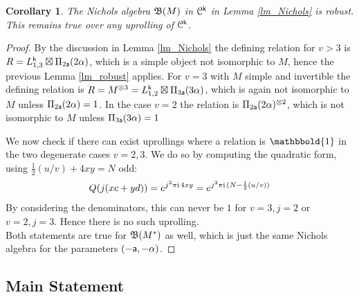 \documentclass[a4paper, reqno]{amsart}
\newtheorem{corollary}[theorem]{Corollary}
\theoremstyle{introTheorems}
\newcommand\cC{\mathcal{C}}
\renewcommand{\1}{\mathbbold{1}}
\begin{document}


\begin{corollary}\label{cor_robust}    
The Nichols algebra $\mathfrak{B}(M)$ in $\cC^\k$ in Lemma \ref{lm_Nichols} is robust. This remains true over any uprolling of $\cC^\k$. 
\end{corollary}
\begin{proof}
 By the discussion in Lemma \ref{lm_Nichols} the defining relation for $v>3$ is  $R=L^{\mathsf{k}}_{1,3}\boxtimes\Pi_{2\mathsf{a}}(2\alpha)$, which is a simple object not isomorphic to $M$, hence the previous Lemma \ref{lm_robust} applies. For $v=3$ with $M$ simple and invertible the defining relation is $R=M^{\otimes 3}=L^{\mathsf{k}}_{1,2}\boxtimes\Pi_{3\mathsf{a}}(3\alpha)$, which is again not isomorphic to $M$ unless $\Pi_{2\mathsf{a}}(2\alpha)=1$. In the case $v=2$ the relation is $\Pi_{2\mathsf{a}}(2\alpha)^{\otimes 2}$, which is not isomorphic to $M$ unless $\Pi_{3\mathsf{a}}(3\alpha)=1$ 

We now check if there can exist uprollings where a relation is $\1$ in the two degenerate cases $v=2,3$. We do so by computing the quadratic form, using $\frac12(u/v)+4xy=N$ odd: 
\[Q(j(xc+yd))
=e^{j^2\pi\mathrm{i} \,4xy }
=e^{j^2\pi\mathrm{i}\,(N-\frac12(u/v))}\]
By considering the denominators, this can never be $1$ for $v=3,j=2$ or $v=2,j=3$. Hence there is no such uprolling.\\

Both statements are true for $\mathfrak{B}(M^*)$ as well, which is just the same Nichols algebra for the parameters $(-\mathsf{a},-\alpha)$.
\end{proof}


\subsection{Main Statement}\label{subsec:BorelEquivalence}
\end{document}

